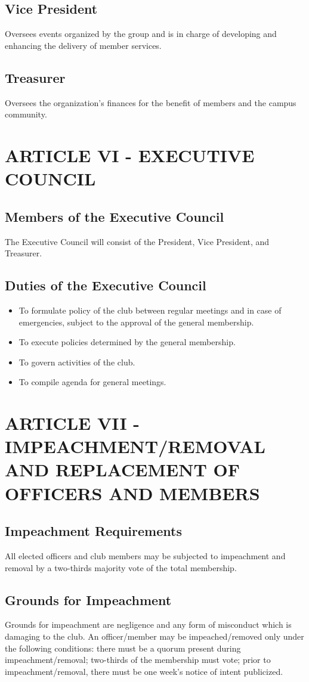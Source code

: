 \documentclass[11pt]{amsart}
\begin{document}
\subsection{Vice President}
Oversees events organized by the group and is in charge of developing and enhancing the delivery of member services.
\subsection{Treasurer}
Oversees the organization’s finances for the benefit of members and the campus community.

\section{ARTICLE VI - EXECUTIVE COUNCIL}
\subsection{Members of the Executive Council}
The Executive Council will consist of the President, Vice President, and Treasurer.

\subsection{Duties of the Executive Council}
\begin{itemize}
\item{To formulate policy of the club between regular meetings and in case of emergencies, subject to the approval of the general membership.}
\item{To execute policies determined by the general membership.}
\item{To govern activities of the club.}
\item{To compile agenda for general meetings.}
\end{itemize}

\section{ARTICLE VII - IMPEACHMENT/REMOVAL AND REPLACEMENT
OF OFFICERS AND MEMBERS}
\subsection{Impeachment Requirements}
All elected officers and club members may be subjected to impeachment and removal by a two-thirds majority vote of the total membership.
\subsection{Grounds for Impeachment}
Grounds for impeachment are negligence and any form of misconduct which is damaging to the club.  An officer/member may be impeached/removed only under the following conditions: there must be a quorum present during impeachment/removal; two-thirds of the membership must vote; prior to impeachment/removal, there must be one week's notice of intent publicized.
\end{document}
